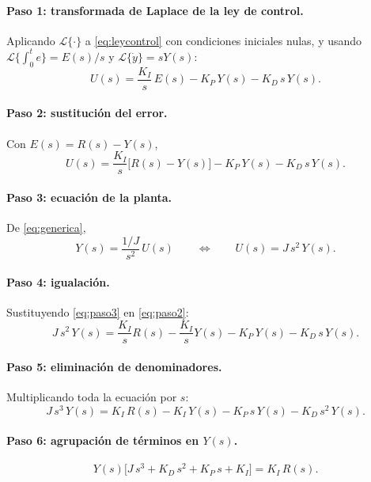 \documentclass[11pt,a4paper]{article}
\newcommand{\Lap}{\mathcal{L}}
\begin{document}
\paragraph{Paso 1: transformada de Laplace de la ley de control.}
Aplicando $\Lap\{\cdot\}$ a \eqref{eq:leycontrol} con condiciones iniciales
nulas, y usando $\Lap\{\int_0^t e\} = E(s)/s$ y $\Lap\{\dot y\}=sY(s)$:
\begin{equation}
U(s)=\frac{K_I}{s}\,E(s)-K_P\,Y(s)-K_D\,s\,Y(s).
\end{equation}

\paragraph{Paso 2: sustitución del error.}
Con $E(s)=R(s)-Y(s)$,
\begin{equation}
U(s)=\frac{K_I}{s}\big[R(s)-Y(s)\big]-K_P\,Y(s)-K_D\,s\,Y(s).
\label{eq:paso2}
\end{equation}

\paragraph{Paso 3: ecuación de la planta.}
De \eqref{eq:generica},
\begin{equation}
Y(s)=\frac{1/J}{s^{2}}\,U(s)
\qquad\Longleftrightarrow\qquad
U(s)=J\,s^{2}\,Y(s).
\label{eq:paso3}
\end{equation}

\paragraph{Paso 4: igualación.}
Sustituyendo \eqref{eq:paso3} en \eqref{eq:paso2}:
\begin{equation}
J\,s^{2}\,Y(s)=\frac{K_I}{s}R(s)-\frac{K_I}{s}Y(s)-K_P\,Y(s)-K_D\,s\,Y(s).
\end{equation}

\paragraph{Paso 5: eliminación de denominadores.}
Multiplicando toda la ecuación por $s$:
\begin{equation}
J\,s^{3}\,Y(s)=K_I\,R(s)-K_I\,Y(s)-K_P\,s\,Y(s)-K_D\,s^{2}\,Y(s).
\end{equation}

\paragraph{Paso 6: agrupación de términos en $Y(s)$.}
\begin{equation}
Y(s)\Big[J\,s^{3}+K_D\,s^{2}+K_P\,s+K_I\Big]=K_I\,R(s).
\end{equation}
\end{document}
